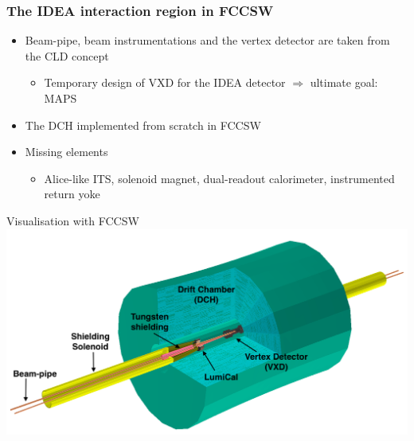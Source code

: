 \documentclass[hyperref={colorlinks=true,pdfpagelabels=false,linkcolor=black}, xcolor=dvipsnames,10pt]{beamer}
\begin{document}
\begin{frame}
	\frametitle{The IDEA interaction region in FCCSW}

	\begin{itemize}
	\item Beam-pipe, beam instrumentations and the vertex detector are taken from the CLD concept
		\begin{itemize}
		\item Temporary design of VXD for the IDEA detector $\Rightarrow $ ultimate goal: MAPS
		\end{itemize}
	\item The DCH implemented from scratch in FCCSW
  \item Missing elements
    \begin{itemize}
      \item Alice-like ITS, solenoid magnet, dual-readout calorimeter, instrumented return yoke
    \end{itemize}
	\end{itemize}

  \vspace{-0.2cm}
	\begin{block}{Visualisation with FCCSW}
	\centering
	\includegraphics[width=\textwidth]{figures/FCCeeIDEA.png}
	\end{block}

\end{frame}
\end{document}
